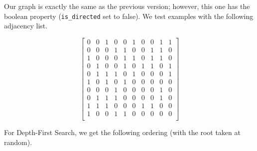 \documentclass[12pt]{scrartcl}
\begin{document}
\problem{}
Our graph is exactly the same as the previous version; however, this one has the boolean property (\texttt{is\_directed} set to false).
We test examples with the following adjacency list.

\[
\begin{bmatrix}
    0 & 0 & 1 & 0 & 0 & 1 & 0 & 0 & 1 & 1 \\
    0 & 0 & 0 & 1 & 1 & 0 & 0 & 1 & 1 & 0 \\
    1 & 0 & 0 & 0 & 1 & 1 & 0 & 1 & 1 & 0 \\
    0 & 1 & 0 & 0 & 1 & 0 & 1 & 1 & 0 & 1 \\
    0 & 1 & 1 & 1 & 0 & 1 & 0 & 0 & 0 & 1 \\
    1 & 0 & 1 & 0 & 1 & 0 & 0 & 0 & 0 & 0 \\
    0 & 0 & 0 & 1 & 0 & 0 & 0 & 0 & 1 & 0 \\
    0 & 1 & 1 & 1 & 0 & 0 & 0 & 0 & 1 & 0 \\
    1 & 1 & 1 & 0 & 0 & 0 & 1 & 1 & 0 & 0 \\
    1 & 0 & 0 & 1 & 1 & 0 & 0 & 0 & 0 & 0 \\
\end{bmatrix}
\]

\subproblem{}
For Depth-First Search, we get the following ordering (with the root taken at random).
\end{document}

